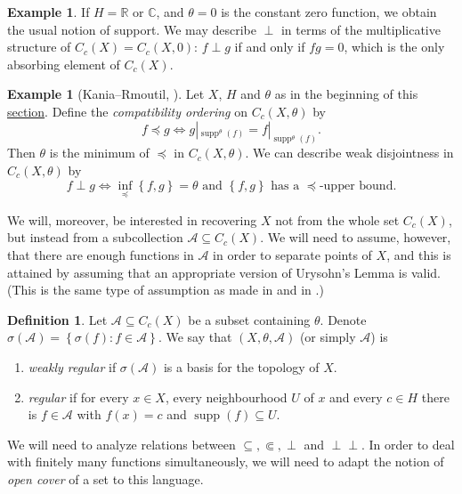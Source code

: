 \documentclass[letter,11pt]{amsart}
\theoremstyle{plain}		\newtheorem{theorem}[generalnumbering]{Theorem}
\theoremstyle{plain}		\newtheorem{corollary}[generalnumbering]{Corollary}
\theoremstyle{definition}		\newtheorem{definition}[generalnumbering]{Definition}
\theoremstyle{definition}		\newtheorem{example}[generalnumbering]{Example}
\theoremstyle{plain}		\newtheorem{proposition}[generalnumbering]{Proposition}
\theoremstyle{plain}		\newtheorem{lemma}[generalnumbering]{Lemma}
\theoremstyle{plain}    \newtheorem{plainstyle}[generalnumbering]{\namefordifferentenvironment}
\theoremstyle{plain}    \newtheorem*{plainstyle*}{\namefordifferentenvironment}
\theoremstyle{definition}    \newtheorem{definitionstyle}[generalnumbering]{\namefordifferentenvironment}
\theoremstyle{definition}    \newtheorem*{definitionstyle*}{\namefordifferentenvironment}
\newcommand{\perpp}{\perp\!\!\!\perp}
\DeclareMathOperator{\supp}{supp}
\begin{document}
\begin{example}\label{examplethetaiszero}
	If $H=\mathbb{R}$ or $\mathbb{C}$, and $\theta=0$ is the constant zero function, we obtain the usual notion of support. We may describe $\perp$ in terms of the multiplicative structure of $C_c(X)=C_c(X,0)$: $f\perp g$ if and only if $fg=0$, which is the only absorbing element of $C_c(X)$.
\end{example}

\begin{example}[Kania--Rmoutil, \cite{MR3813611}]\label{examplekaniarmoutil}
	Let $X$, $H$ and $\theta$ as in the beginning of this \hyperref[sectiondisjointness]{section}. Define the \emph{compatibility ordering} on $C_c(X,\theta)$ by
	\[f\preceq g\iff g|_{\supp^\theta(f)}=f|_{\supp^\theta(f)}.\]
	Then $\theta$ is the minimum of $\preceq$ in $C_c(X,\theta)$. We can describe weak disjointness in $C_c(X,\theta)$ by
	\[f\perp g\iff\inf_{\preceq}\left\{f,g\right\}=\theta\text{ and }\left\{f,g\right\}\text{ has a }\preceq\text{-upper bound.}\]
\end{example}

We will, moreover, be interested in recovering $X$ not from the whole set $C_c(X)$, but instead from a subcollection $\mathcal{A}\subseteq C_c(X)$. We will need to assume, however, that there are enough functions in $\mathcal{A}$ in order to separate points of $X$, and this is attained by assuming that an appropriate version of Urysohn's Lemma is valid. (This is the same type of assumption as made in \cite{MR0020715} and in \cite{MR2324919}.)

\begin{definition}\label{definitionregularperpp}
	Let $\mathcal{A}\subseteq C_c(X)$ be a subset containing $\theta$. Denote $\sigma(\mathcal{A})=\left\{\sigma(f):f\in\mathcal{A}\right\}$. We say that $(X,\theta,\mathcal{A})$ (or simply $\mathcal{A}$) is
	\begin{enumerate}[label=(\arabic*)]
		\item \emph{weakly regular} if $\sigma(\mathcal{A})$ is a basis for the topology of $X$.
		\item \emph{regular} if for every $x\in X$, every neighbourhood $U$ of $x$ and every $c\in H$ there is $f\in\mathcal{A}$ with $f(x)=c$ and $\supp(f)\subseteq U$.
	\end{enumerate}
\end{definition}


We will need to analyze relations between $\subseteq,\Subset,\perp$ and $\perpp$. In order to deal with finitely many functions simultaneously, we will need to adapt the notion of \emph{open cover} of a set to this language.
\end{document}
